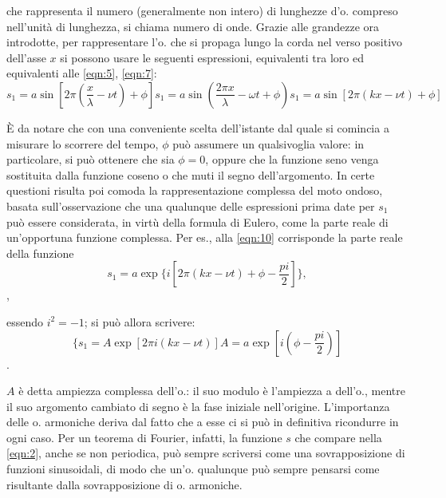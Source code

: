 \documentclass[a4paper]{article}
\begin{document}
che rappresenta il numero (generalmente non intero) di lunghezze d'o. compreso nell'unità di lunghezza, si chiama numero di onde. Grazie alle grandezze ora introdotte, per rappresentare l'o. che si propaga lungo la corda nel verso positivo dell'asse $x$ si possono usare le seguenti espressioni, equivalenti tra loro ed equivalenti alle \eqref{eqn:5}, \eqref{eqn:7}: 
\begin{equation}
s_1=a\sin[2\pi(\frac{x}{\lambda}-\nu t)+\phi]
s_1=a\sin(\frac{2\pi x}{\lambda}-\omega t+\phi)
s_1=a\sin[2\pi(kx-\nu t)+\phi]
\end{equation}

È da notare che con una conveniente scelta dell'istante dal quale si comincia a misurare lo scorrere del tempo, $\phi$ può assumere un qualsivoglia valore: in particolare, si può ottenere che sia $\phi=0$, oppure che la funzione seno venga sostituita dalla funzione coseno o che muti il segno dell'argomento. In certe questioni risulta poi comoda la rappresentazione complessa del moto ondoso, basata sull'osservazione che una qualunque delle espressioni prima date per $s_1$ può essere considerata, in virtù della formula di Eulero, come la parte reale di un'opportuna funzione complessa. Per es., alla \eqref{eqn:10} corrisponde la parte reale della funzione 
\begin{equation}
s_1=a\exp\{i[2\pi(kx-\nu t)+\phi-\frac{pi}{2}]\},
\end{equation},

essendo $i^2=-1$; si può allora scrivere:
\begin{equation}
\{s_1=A\exp[2\pi i(kx-\nu t)]
A=a\exp[i(\phi-\frac{pi}{2})]
\end{equation}.

$A$ è detta ampiezza complessa dell'o.: il suo modulo è l'ampiezza a dell'o., mentre il suo argomento cambiato di segno è la fase iniziale nell'origine. L'importanza delle o. armoniche deriva dal fatto che a esse ci si può in definitiva ricondurre in ogni caso. Per un teorema di Fourier, infatti, la funzione $s$ che compare nella \eqref{eqn:2}, anche se non periodica, può sempre scriversi come una sovrapposizione di funzioni sinusoidali, di modo che un'o. qualunque può sempre pensarsi come risultante dalla sovrapposizione di o. armoniche. 
\end{document}
